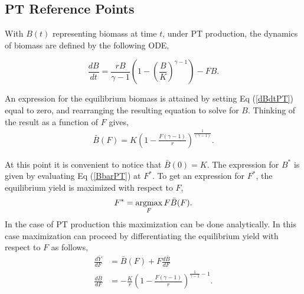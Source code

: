 \documentclass[12pt]{article}
\newcommand{\argmax}{\operatornamewithlimits{argmax}}
\begin{document}

%
\subsection{PT Reference Points}\label{ptRef}
%
With $B(t)$ representing biomass at time $t$, under PT production, the 
dynamics of biomass are defined by the following ODE,
 
\begin{equation}
\frac{dB}{dt} = \frac{r B}{\gamma-1} \left(1-\left(\frac{B}{K}\right)^{\gamma-1}\right) - FB. \label{dBdtPT}
\end{equation}

An expression for the equilibrium biomass is attained by setting Eq (\ref{dBdtPT}) 
equal to zero, and rearranging the resulting equation to solve for $B$. 
Thinking of the result as a function of $F$ gives, 
\begin{align}
\bar B(F) = K\left(1-\frac{F(\gamma-1)}{r}\right)^{\frac{1}{(\gamma-1)}}. \label{BbarPT}
\end{align}

At this point it is convenient to notice that $\bar B(0)=K$. The expression for 
$B^*$ is given by evaluating Eq (\ref{BbarPT}) at $F^*$.
%
To get an expression for $F^*$, the equilibrium yield is maximized with respect to $F$,
\begin{equation}
F^* = \argmax_F F\bar B(F).
\end{equation}
%
In the case of PT production this maximization can be done analytically. In this 
case maximization can proceed by differentiating the equilibrium yield with 
respect to $F$ as follows,
%
\begin{align}
\frac{d \bar{Y}}{dF} &= \bar B(F) + F \frac{d \bar B}{dF} \label{FderivPT}\\
\frac{d \bar B}{dF} &= -\frac{K}{r}\left(1-\frac{F(\gamma-1)}{r}\right)^{\frac{1}{\gamma-1}-1}\label{dBdFPT}.
\end{align}
\end{document}
